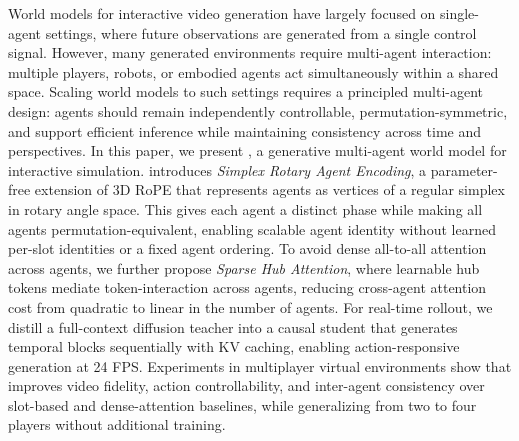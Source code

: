 World models for interactive video generation have largely focused on single-agent settings, where future observations are generated from a single control signal. 
However, many generated environments require multi-agent interaction: multiple players, robots, or embodied agents act simultaneously within a shared space. 
Scaling world models to such settings requires a principled multi-agent design: agents should remain independently controllable, permutation-symmetric, and support efficient inference while maintaining consistency across time and perspectives.
In this paper, we present \ours, a generative multi-agent world model for interactive simulation. 
\ours introduces \emph{Simplex Rotary Agent Encoding}, a parameter-free extension of 3D RoPE that represents agents as vertices of a regular simplex in rotary angle space. This gives each agent a distinct phase while making all agents permutation-equivalent, enabling scalable agent identity without learned per-slot identities or a fixed agent ordering. 
To avoid dense all-to-all attention across agents, we further propose \emph{Sparse Hub Attention}, where learnable hub tokens mediate token-interaction across agents, reducing cross-agent attention cost from quadratic to linear in the number of agents. 
For real-time rollout, we distill a full-context diffusion teacher into a causal student that generates temporal blocks sequentially with KV caching, enabling action-responsive generation at 24 FPS.
Experiments in multiplayer virtual environments show that \ours improves video fidelity, action controllability, and inter-agent consistency over slot-based and dense-attention baselines, while generalizing from two to four players without additional training. 
